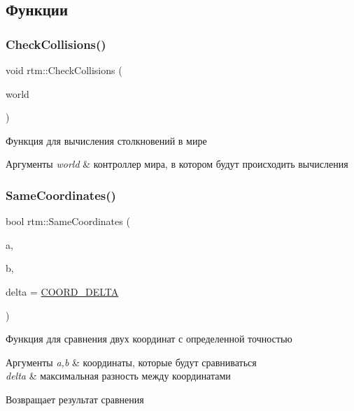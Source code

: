 \subsection{Функции}
\mbox{\label{namespacertm_a1fe2c356e3297343804842a57ce23a4b}} 
\subsubsection{\texorpdfstring{Check\+Collisions()}{CheckCollisions()}}
{\footnotesize\ttfamily void rtm\+::\+Check\+Collisions (\begin{DoxyParamCaption}\item[{\hyperlink{classrtm_1_1_world_controller}{World\+Controller} $\ast$const}]{world }\end{DoxyParamCaption})}

Функция для вычисления столкновений в мире 
\begin{DoxyParams}{Аргументы}
{\em world} & контроллер мира, в котором будут происходить вычисления \\
\hline
\end{DoxyParams}
\mbox{\label{namespacertm_aa633b82b63b7cff4e9b08bf6a05ec383}} 
\subsubsection{\texorpdfstring{Same\+Coordinates()}{SameCoordinates()}}
{\footnotesize\ttfamily bool rtm\+::\+Same\+Coordinates (\begin{DoxyParamCaption}\item[{float}]{a,  }\item[{float}]{b,  }\item[{float}]{delta = {\ttfamily \hyperlink{namespacertm_a9ae158a8873bdf59aa9872cdada6c657}{C\+O\+O\+R\+D\+\_\+\+D\+E\+L\+TA}} }\end{DoxyParamCaption})}

Функция для сравнения двух координат с определенной точностью 
\begin{DoxyParams}{Аргументы}
{\em a,b} & координаты, которые будут сравниваться \\
\hline
{\em delta} & максимальная разность между координатами \\
\hline
\end{DoxyParams}
\begin{DoxyReturn}{Возвращает}
результат сравнения 
\end{DoxyReturn}
\mbox{\label{namespacertm_a511bf31b8bfc36474baaf915bc11a619}} 
